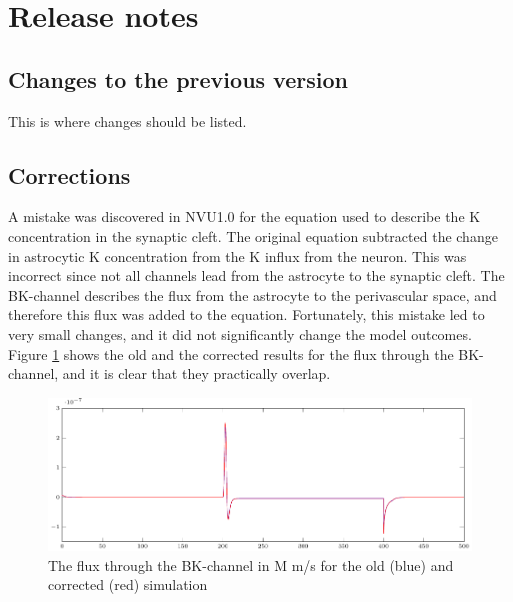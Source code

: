 \section{Release notes}

\subsection{Changes to the previous version}
This is where changes should be listed.



\subsection{Corrections}
A mistake was discovered in NVU1.0 for the equation used to describe the \gls{K} concentration in the synaptic cleft. The original equation subtracted the change in astrocytic \gls{K} concentration from the \gls{K} influx from the neuron. This was incorrect since not all channels lead from the astrocyte to the synaptic cleft. The BK-channel describes the flux from the astrocyte to the perivascular space, and therefore this flux was added to the equation. Fortunately, this mistake led to very small changes, and it did not significantly change the model outcomes. Figure \ref{fig:cordif} shows the old and the corrected results for the flux through the BK-channel, and it is clear that they practically overlap. 

\begin{figure}[h!]
	\centering
	\tiny  
	\setlength\figureheight{5 cm} 
	\setlength\figurewidth{15 cm}
	\includegraphics[width=15cm]{figures/diff_cor.pdf}
	\caption{The flux through the BK-channel in \textmu M m/s for the old (blue) and corrected (red) simulation }
	\label{fig:cordif}
\end{figure}
